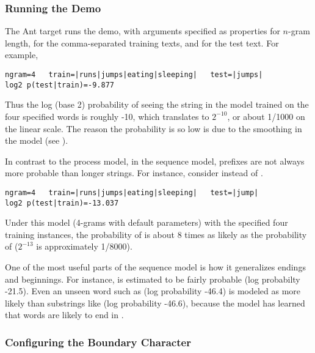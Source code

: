 \subsubsection{Running the Demo}

The Ant target  runs the demo, with arguments
specified as properties  for $n$-gram length, 
 for the comma-separated training texts,
and  for the test text.  For example,
%
\begin{verbatim}
ngram=4   train=|runs|jumps|eating|sleeping|   test=|jumps|
log2 p(test|train)=-9.877
\end{verbatim}
%
Thus the log (base 2) probability of seeing the string
 in the model trained on the four specified words
is roughly -10, which translates to $2^{-10}$, or about 1/1000 on the
linear scale.  The reason the probability is so low is due to the
smoothing in the model (see ).

In contrast to the process model, in the sequence model, prefixes
are not always more probable than longer strings.  For
instance, consider  instead of .
%
\begin{verbatim}
ngram=4   train=|runs|jumps|eating|sleeping|   test=|jump|
log2 p(test|train)=-13.037
\end{verbatim}
%
Under this model (4-grams with default parameters) with the specified
four training instances, the probability of  is
about 8 times as likely as the probability of 
($2^{-13}$ is approximately 1/8000).

One of the most useful parts of the sequence model is how it
generalizes endings and beginnings.  For instance,
 is estimated to be fairly probable (log
probabilty -21.5).  Even an unseen word such as
 (log probability -46.4) is modeled as more
likely than substrings like  (log probability
-46.6), because the model has learned that words are likely to end in
. 


\subsubsection{Configuring the Boundary Character}

